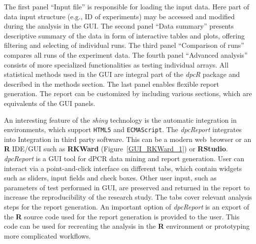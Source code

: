 \documentclass[a4,center,fleqn]{NAR}
\begin{document}
The first panel ``Input file'' is responsible for loading the input data. Here 
part of data input structure (e.g., ID of experiments) may be accessed and 
modified during the analysis in the GUI. The second panel ``Data summary'' 
presents descriptive summary of the data in form of interactive tables and 
plots, offering filtering and selecting of individual runs. The third panel 
``Comparison of runs'' compares all runs of the experiment data. The fourth 
panel ``Advanced analysis'' consists of more specialized functionalities as 
testing individual arrays. All statistical methods used in the GUI are integral 
part of the \textit{dpcR} package and described in the methods section. The 
last 
panel enables flexible report generation. The report can be customized by 
including various sections, which are equivalents of the GUI panels.

An interesting feature of the \textit{shiny} technology is the automatic 
integration in environments, which support \texttt{HTML5} and 
\texttt{ECMAScript}. The \textit{dpcReport} integrates into Integration in 
third 
party software. This can be a modern web~browser or an \textbf{R} IDE/GUI such 
as \textbf{RKWard} (Figure~\ref{GUI_RKWard_1}) \cite{rodiger_rkward_2012} or 
\textbf{RStudio}. \textit{dpcReport} is a GUI tool for dPCR data mining and 
report generation. User can interact via a point-and-click interface on 
different tabs, which contain widgets such as sliders, input fields and check 
boxes. Other user input, such as parameters of test performed in GUI, are 
preserved and returned in the report to increase the reproducibility of the 
research study. The tabs cover relevant analysis steps for the report 
generation. An important option of \textit{dpcReport} is an export of the 
\textbf{R} source code used for the report generation is provided to the user. 
This code can be used for recreating the analysis in the \textbf{R} environment 
or prototyping more complicated workflows.
\end{document}
